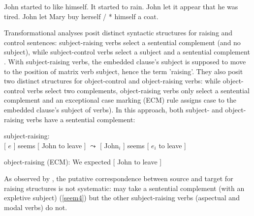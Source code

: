 \documentclass[output=paper
	        ,collection
	        ,collectionchapter
 	        ,biblatex
                ,babelshorthands
                ,newtxmath
                ,draftmode
                ,colorlinks, citecolor=brown
]{langscibook}
\begin{document}
	\begin{exe}
\ex  \begin{xlist}
\ex John started to like himself.
\ex It started to rain.
\ex John let it appear that he was tired.
\ex John let Mary buy herself / * himself a coat.
	 \end{xlist}
	 \end{exe}
	

Transformational analyses posit distinct syntactic structures for raising and control sentences: subject-raising verbs select a sentential complement (and no subject), while subject-control verbs select a subject and a sentential complement \citep{Postal1974, Chomsky81a}. With subject-raising verbs, the embedded clause's subject is supposed to move to the position of matrix verb subject, hence the  term 'raising'. They also posit two distinct structures for object-control and object-raising verbs: while object-control verbs select two complements, object-raising verbs only select a sentential complement and
an exceptional case marking (ECM) rule assigns case to the embedded clause's subject of  verbs).
In this approach, both subject- and object-raising verbs have a sentential complement:
	
\begin{exe}
\ex  \begin{xlist}
\ex 	subject-raising:\\
{}[ $e$ ] seems [ John to leave ] 
$\leadsto$  
{}[ John$_{i}$ ] seems [ $e_{i}$ to leave ]	

\ex 	object-raising (ECM): We expected [ John to leave ] 	
 \end{xlist}
 \end{exe}

As observed by \citet{PollardandSag1994}\addpages, the putative correspondence between source and target for raising structures is not systematic:  may take a sentential complement (with an expletive subject) (\ref{seem4}) but the other subject-raising verbs (aspectual and modal verbs) do not. 
\end{document}
